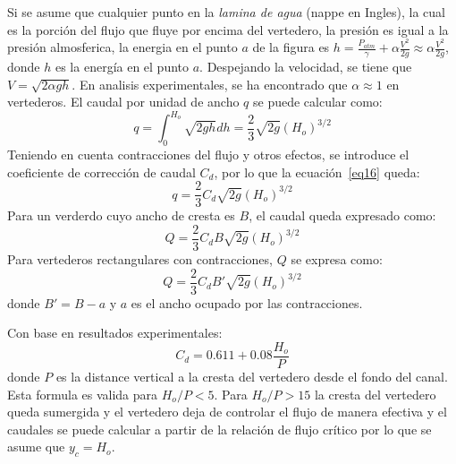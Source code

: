 \documentclass[11pt, oneside]{article}
\begin{document}
Si se asume que cualquier punto en la \emph{lamina de agua} (nappe en Ingles), la cual es la porci\'on del flujo que fluye por encima del vertedero, la presi\'on es igual a la presi\'on almosferica, la energia en el punto $a$ de la figura es $h = \frac{P_{atm}}{\gamma} + \alpha \frac{V^2}{2g} \approx \alpha \frac{V^2}{2g}$, donde $h$ es la energ\'ia en el punto $a$. Despejando la velocidad, se tiene que $V = \sqrt{2 \alpha g h }$. En analisis experimentales, se ha encontrado que $\alpha \approx 1$ en vertederos. El caudal por unidad de ancho $q$ se puede calcular como:
\begin{equation}
    q = \int_{0}^{H_o} \sqrt{2gh} dh = \frac{2}{3}\sqrt{2g}\left(H_o \right)^{3/2}
    \label{eq16}
\end{equation}
Teniendo en cuenta contracciones del flujo y otros efectos, se introduce el coeficiente de correcci\'on de caudal $C_d$, por lo que la ecuaci\'on~\ref{eq16} queda:
\begin{equation}
    q = \frac{2}{3}C_d\sqrt{2g}\left(H_o \right)^{3/2}
    \label{eq17}
\end{equation}
Para un verderdo cuyo ancho de cresta es $B$, el caudal queda expresado como:
\begin{equation}
    Q = \frac{2}{3}C_d B\sqrt{2g}\left(H_o \right)^{3/2}
    \label{eq17a}
\end{equation}
Para vertederos rectangulares con contracciones, $Q$ se expresa como:
\begin{equation}
    Q = \frac{2}{3}C_d B' \sqrt{2g}\left(H_o \right)^{3/2}
    \label{eq17b}
\end{equation}
donde $B' = B - a$ y $a$ es el ancho ocupado por las contracciones. 

Con base en resultados experimentales:
\begin{equation}
    C_d = 0.611 + 0.08\frac{H_o}{P}
    \label{eq18}
\end{equation}
donde $P$ es la distance vertical a la cresta del vertedero desde el fondo del canal. Esta formula es valida para $H_o / P < 5$. Para $H_o / P > 15$ la cresta del vertedero queda sumergida y el vertedero deja de controlar el flujo de manera efectiva y el caudales se puede calcular a partir de la relaci\'on de flujo cr\'itico por lo que se asume que $y_c = H_o$.
\end{document}
